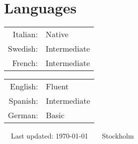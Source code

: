 \documentclass[11pt]{article} %
\begin{document}
\section*{Languages}\startseclist

\begin{minipage}[t]{.45\textwidth}
\begin{tabular}{rl}
Italian: & Native\\
Swedish: & Intermediate\\
French: & Intermediate\\
\end{tabular}
\end{minipage}%
\begin{minipage}[t]{.45\textwidth}
\begin{tabular}{rl}
English: & Fluent\\
Spanish: & Intermediate\\
German: & Basic\\
\end{tabular}
\end{minipage}


\begin{center}
	\scriptsize
	\raisebox{-0.5pt}{\textbullet}~~Last updated: \today~~\raisebox{-0.5pt}{\textbullet}~~Stockholm~~\raisebox{-0.5pt}{\textbullet}
\end{center}
\end{document}
